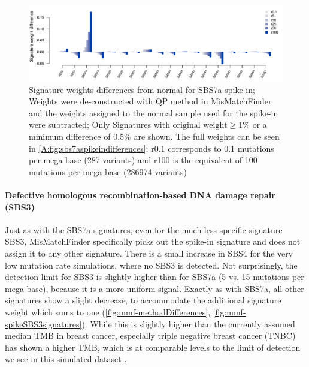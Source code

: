 \begin{figure}[!ht]
\centering
\includegraphics[width=.99\linewidth]{Figures/MisMatchFinder/SBS7SpikeInSignatureDifferencesFocussed.pdf}
\caption[Signature weights differences from normal for SBS7a spike-in]{Signature weights differences from normal for SBS7a spike-in; Weights were de-constructed with QP method in MisMatchFinder and the weights assigned to the normal sample used for the spike-in were subtracted; Only Signatures with $\text{original weight}\geq 1\%$ or a minimum difference of 0.5\% are shown. The full weights can be seen in \protect\autoref{A:fig:sbs7aspikeindifferences}; r0.1 corresponds to 0.1 mutations per mega base (287 variants) and r100 is the equivalent of 100 mutations per mega base (286974 variants)}\label{fig:mmf-spikeSBS7asignatures}
\end{figure}

\paragraph{Defective homologous recombination-based DNA damage repair (SBS3)}
\label{mmf-sec:mbcSim}

Just as with the SBS7a signatures, even for the much less specific signature SBS3, MisMatchFinder specifically picks out the spike-in signature and does not assign it to any other signature. There is a small increase in SBS4 for the very low mutation rate simulations, where no SBS3 is detected. Not surprisingly, the detection limit for SBS3 is slightly higher than for SBS7a (5 vs. 15 mutations per mega base), because it is a more uniform signal. Exactly as with SBS7a, all other signatures show a slight decrease, to accommodate the additional signature weight which sums to one (\autoref{fig:mmf-methodDifferences}, \autoref{fig:mmf-spikeSBS3signatures}). While this is slightly higher than the currently assumed median TMB in breast cancer, especially triple negative breast cancer (TNBC) has shown a higher TMB, which is at comparable levels to the limit of detection we see in this simulated dataset \cite{BarrosoSousa2020}.

